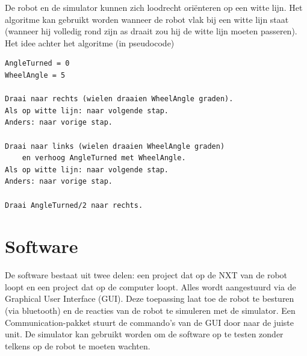 \documentclass[tt3]{penoverslag}
\begin{document}
De robot en de simulator kunnen zich loodrecht ori\"enteren op een witte lijn.
Het algoritme kan gebruikt worden wanneer de robot vlak bij een witte lijn staat (wanneer hij volledig rond zijn as draait zou hij de witte lijn moeten passeren). Het idee achter het algoritme (in pseudocode)

\lstset{frame=single, caption=Witte Lijn algoritme (pseudocode),
		label=code:algoWitteL, numbers=left, numberstyle=\footnotesize,
		basicstyle=\sffamily, numbersep=5pt}
\begin{lstlisting}
AngleTurned = 0
WheelAngle = 5

Draai naar rechts (wielen draaien WheelAngle graden).
Als op witte lijn: naar volgende stap.
Anders: naar vorige stap.

Draai naar links (wielen draaien WheelAngle graden)
	en verhoog AngleTurned met WheelAngle.
Als op witte lijn: naar volgende stap.
Anders: naar vorige stap.

Draai AngleTurned/2 naar rechts.
\end{lstlisting}

\section{Software} %
\label{sec:softw}
De software bestaat uit twee delen: een project dat op de NXT van de robot loopt en een project dat op de computer loopt. Alles wordt aangestuurd via de Graphical User Interface (GUI). Deze toepassing laat toe de robot te besturen (via bluetooth) en de reacties van de robot te simuleren met de simulator. Een Communication-pakket stuurt de commando's van de GUI door naar de juiste unit.
De simulator kan gebruikt worden om de software op te testen zonder telkens op de robot te moeten wachten.

\end{document}
